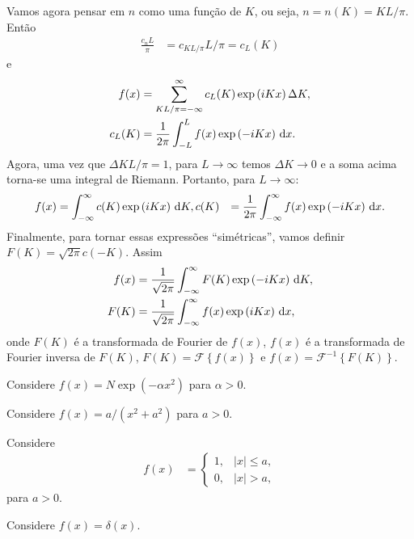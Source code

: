 Vamos agora pensar em $n$ como uma função de $K$, ou seja, $n = n(K) = K
L / \pi$. Então
\begin{align*}
    \frac{c_n L}{\pi} &= c_{K L / \pi} L / \pi = c_L(K)
\end{align*}
e
\begin{align*}
    f(x) &= \sum_{K L / \pi = -\infty}^\infty c_L(K) \exp\left( i K x \right)
    \Delta K, \\
    c_L(K) &= \frac{1}{2 \pi} \int_{-L}^L f(x) \exp\left( - i K x \right)
    \, \mathrm{d}x.
\end{align*}
Agora, uma vez que $\Delta K L / \pi = 1$, para $L \to \infty$ temos $\Delta K
\to 0$ e a soma acima torna-se uma integral de Riemann. Portanto, para $L \to
\infty$:
\begin{align*}
    f(x) &= \int_{-\infty}^\infty c(K) \exp\left( i K x \right) \, \mathrm{d}K,
    c(K) &= \frac{1}{2 \pi} \int_{-\infty}^\infty f(x) \exp\left( - i K x
    \right) \, \mathrm{d}x.
\end{align*}
Finalmente, para tornar essas expressões ``simétricas'', vamos definir
$F(K) = \sqrt{2 \pi} c(-K)$. Assim
\begin{align*}
    f(x) &= \frac{1}{\sqrt{2 \pi}} \int_{-\infty}^\infty F(K) \exp\left( -i K x
    \right) \, \mathrm{d}K, \\
    F(K) &= \frac{1}{\sqrt{2 \pi}} \int_{-\infty}^\infty f(x) \exp\left( i K x
    \right) \, \mathrm{d}x,
\end{align*}
onde $F(K)$ é a transformada de Fourier de $f(x)$, $f(x)$ é a
transformada de Fourier inversa de $F(K)$, $F(K) = \mathcal{F}\left\{ f(x)
\right\}$ e $f(x) = \mathcal{F}^{-1}\left\{ F(K) \right\}$.
\begin{exem}
    Considere $f(x) = N \exp\left( - \alpha x^2 \right)$ para $\alpha > 0$.
\end{exem}
\begin{exem}
    Considere $f(x) = a / \left( x^2 + a^2 \right)$ para $a > 0$.
\end{exem}
\begin{exem}
    Considere
    \begin{align*}
        f(x) &= \begin{cases}
            1, & |x| \leq a, \\
            0, & |x| > a,
        \end{cases}
    \end{align*}
    para $a > 0$.
\end{exem}
\begin{exem}
    Considere $f(x) = \delta(x)$.
\end{exem}

